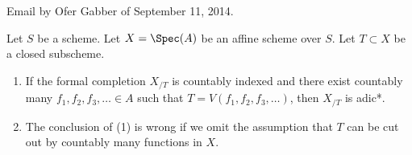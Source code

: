 \begin{lemma}
\label{lemma-completion-countably-indexed}
\begin{reference}
Email by Ofer Gabber of September 11, 2014.
\end{reference}
Let $S$ be a scheme. Let $X = \Spec(A)$ be an affine scheme over $S$.
Let $T \subset X$ be a closed subscheme.
\begin{enumerate}
\item If the formal completion $X_{/T}$ is countably indexed
and there exist countably many $f_1, f_2, f_3, \ldots \in A$ such that
$T = V(f_1, f_2, f_3, \ldots)$, then $X_{/T}$ is adic*.
\item The conclusion of (1) is wrong if we omit the assumption that
$T$ can be cut out by countably many functions in $X$.
\end{enumerate}
\end{lemma}

